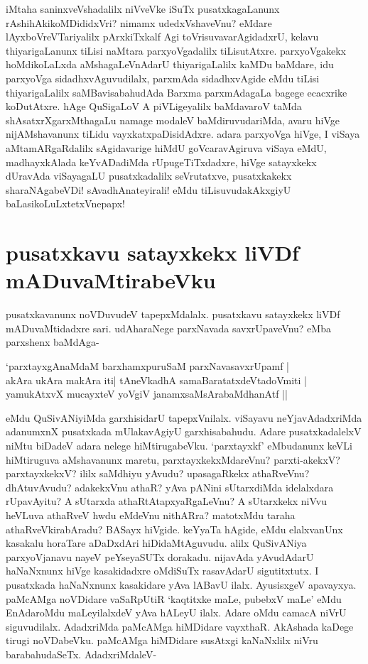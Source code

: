 iMtaha saninxveVshadalilx niVveVke iSuTx pusatxkagaLanunx rAshihAkikoMDididxVri? nimamx udedxVshaveVnu? eMdare lAyxboVreVTariyalilx pArxkiTxkalf  Agi toVrisuvavarAgidadxrU, kelavu thiyarigaLanunx tiLisi naMtara parxyoVgadalilx tiLisutAtxre. parxyoVgakekx hoMdikoLaLxda aMshagaLeVnAdarU thiyarigaLalilx kaMDu baMdare, idu parxyoVga sidadhxvAguvudilalx, parxmAda sidadhxvAgide eMdu tiLisi thiyarigaLalilx saMBavisabahudAda Barxma parxmAdagaLa bagege ecacxrike koDutAtxre. hAge QuSigaLoV A piVLigeyalilx baMdavaroV taMda shAsatxrXgarxMthagaLu namage modaleV baMdiruvudariMda, avaru hiVge nijAMshavanunx tiLidu vayxkatxpaDisidAdxre. adara parxyoVga hiVge, I viSaya aMtamARgaRdalilx sAgidavarige hiMdU goVcaravAgiruva viSaya eMdU, madhayxkAlada keYvADadiMda rUpugeTiTxdadxre, hiVge satayxkekx dUravAda viSayagaLU pusatxkadalilx seVrutatxve, pusatxkakekx sharaNAgabeVDi! sAvadhAnateyirali! eMdu tiLisuvudakAkxgiyU baLasikoLuLxtetxVnepapx!

\section*{pusatxkavu satayxkekx liVDf mADuvaMtirabeVku}

pusatxkavanunx noVDuvudeV tapepxMdalalx. pusatxkavu satayxkekx liVDf mADuvaMtidadxre sari. udAharaNege parxNavada savxrUpaveVnu? eMba parxshenx baMdAga-

\begin{shloka}
`parxtayxgAnaMdaM barxhamxpuruSaM parxNavasavxrUpamf |\label{106a}\\
akAra ukAra makAra iti| tAneVkadhA samaBaratatxdeVtadoVmiti |\\
yamukAtxvX mucayxteV yoVgiV janamxsaMsArabaMdhanAtf ||
\end{shloka}

eMdu QuSivANiyiMda garxhisidarU tapepxVnilalx. viSayavu neYjavAdadxriMda adanumxnX pusatxkada mUlakavAgiyU garxhisabahudu. Adare pusatxkadalelxV niMtu biDadeV adara nelege hiMtirugabeVku. `parxtayxkf' eMbudanunx keVLi hiMtiruguva aMshavanunx maretu, parxtayxkekxMdareVnu? parxti-akekxV? parxtayxkekxV? ililx saMdhiyu yAvudu? upasagaRkekx athaRveVnu? dhAtuvAvudu? adakekxVnu athaR? yAva pANini sUtarxdiMda idelalxdara rUpavAyitu? A sUtarxda athaRtAtapxyaRgaLeVnu? A sUtarxkekx niVvu heVLuva athaRveV hwdu eMdeVnu nithARra? matotxMdu taraha athaRveVkirabAradu? BASayx hiVgide. keYyaTa hAgide, eMdu elalxvanUnx kasakalu horaTare aDaDxdAri hiDidaMtAguvudu. alilx QuSivANiya parxyoVjanavu nayeV peYseyaSUTx dorakadu. nijavAda yAvudAdarU haNaNxnunx hiVge kasakidadxre oMdiSuTx rasavAdarU sigutitxtutx. I pusatxkada haNaNxnunx kasakidare yAva lABavU ilalx. AyusisxgeV apavayxya. paMcAMga noVDidare vaSaRpUtiR `kaqtitxke maLe, pubebxV maLe' eMdu EnAdaroMdu maLeyilalxdeV yAva hALeyU ilalx. Adare oMdu camacA niVrU siguvudilalx. AdadxriMda paMcAMga hiMDidare vayxthaR. AkAshada kaDege tirugi noVDabeVku. paMcAMga hiMDidare susAtxgi kaNaNxlilx niVru barabahudaSeTx. AdadxriMdaleV-

